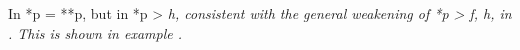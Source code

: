 In  *p = **p,
but in  *p > \it{h},
consistent with the general weakening of *p > \it{f,
h,} {\0} in .
This is shown in example .
%

